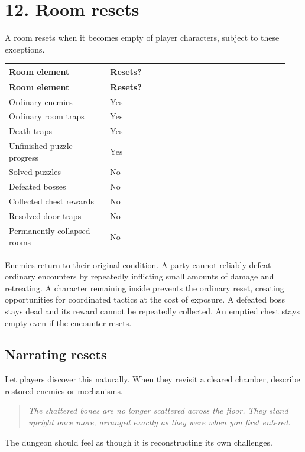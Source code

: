 \section{12. Room resets}

A room resets when it becomes empty of player characters, subject to these exceptions.

\begin{longtable}{p{0.34\linewidth}p{0.6\linewidth}}

\rowcolor{tablehead} \textbf{Room element} & \textbf{Resets?} \\

\endfirsthead

\rowcolor{tablehead} \textbf{Room element} & \textbf{Resets?} \\

\endhead

Ordinary enemies & Yes \\

Ordinary room traps & Yes \\

Death traps & Yes \\

Unfinished puzzle progress & Yes \\

Solved puzzles & No \\

Defeated bosses & No \\

Collected chest rewards & No \\

Resolved door traps & No \\

Permanently collapsed rooms & No \\

\end{longtable}

Enemies return to their original condition. A party cannot reliably defeat ordinary encounters by repeatedly inflicting small amounts of damage and retreating. A character remaining inside prevents the ordinary reset, creating opportunities for coordinated tactics at the cost of exposure. A defeated boss stays dead and its reward cannot be repeatedly collected. An emptied chest stays empty even if the encounter resets.

\subsection{Narrating resets}

Let players discover this naturally. When they revisit a cleared chamber, describe restored enemies or mechanisms.

\begin{quote}\itshape The shattered bones are no longer scattered across the floor. They stand upright once more, arranged exactly as they were when you first entered.\end{quote}

The dungeon should feel as though it is reconstructing its own challenges.
